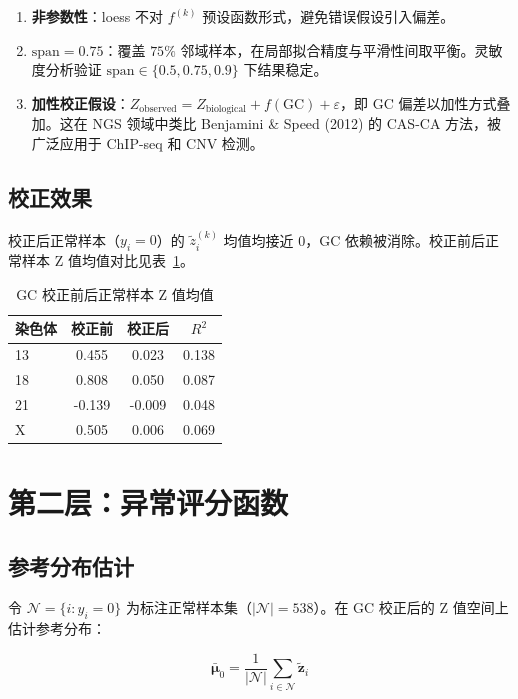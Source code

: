 \documentclass[UTF8]{ctexart}
\begin{document}
\begin{enumerate}
    \item \textbf{非参数性}：loess 不对 $f^{(k)}$ 预设函数形式，避免错误假设引入偏差。
    \item \textbf{$\text{span}=0.75$}：覆盖 $75\%$ 邻域样本，在局部拟合精度与平滑性间取平衡。灵敏度分析验证 $\text{span} \in \{0.5, 0.75, 0.9\}$ 下结果稳定。
    \item \textbf{加性校正假设}：$Z_{\text{observed}} = Z_{\text{biological}} + f(\text{GC}) + \varepsilon$，即 GC 偏差以加性方式叠加。这在 NGS 领域中类比 Benjamini \& Speed (2012) 的 CAS-CA 方法，被广泛应用于 ChIP-seq 和 CNV 检测。
\end{enumerate}

\subsection{校正效果}

校正后正常样本（$y_i=0$）的 $\tilde{z}_i^{(k)}$ 均值均接近 0，GC 依赖被消除。校正前后正常样本 Z 值均值对比见表~\ref{tab:gc-corr}。

\begin{table}[h]
\centering
\caption{GC 校正前后正常样本 Z 值均值}
\label{tab:gc-corr}
\begin{tabular}{lccc}
\toprule
染色体 & 校正前 & 校正后 & $R^2$ \\
\midrule
13 & 0.455 & 0.023 & 0.138 \\
18 & 0.808 & 0.050 & 0.087 \\
21 & -0.139 & -0.009 & 0.048 \\
X & 0.505 & 0.006 & 0.069 \\
\bottomrule
\end{tabular}
\end{table}

\section{第二层：异常评分函数}

\subsection{参考分布估计}

令 $\mathcal{N} = \{i: y_i = 0\}$ 为标注正常样本集（$|\mathcal{N}|=538$）。在 GC 校正后的 Z 值空间上估计参考分布：

\[
\bar{\boldsymbol{\mu}}_0 = \frac{1}{|\mathcal{N}|} \sum_{i \in \mathcal{N}} \tilde{\mathbf{z}}_i
\]
\end{document}
